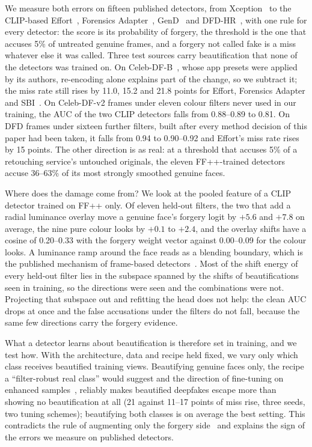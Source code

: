 \documentclass[conference]{IEEEtran}
\begin{document}
We measure both errors on fifteen published detectors, from Xception~\cite{xception} to the CLIP-based
Effort~\cite{effort}, Forensics Adapter~\cite{forensicsadapter}, GenD~\cite{gend2026} and DFD-HR~\cite{dfdhr2026}, with one rule for every detector: the score is its
probability of forgery, the threshold is the one that accuses 5\% of untreated genuine frames, and a forgery not called
fake is a miss whatever else it was called. Three test sources carry beautification that none of the detectors was
trained on. On Celeb-DF-B~\cite{libourel2024}, whose app presets were applied by its authors, re-encoding alone explains
part of the change, so we subtract it; the miss rate still rises by 11.0, 15.2 and 21.8 points for Effort, Forensics
Adapter and SBI~\cite{sbi}. On Celeb-DF-v2 frames under eleven colour filters never used in our training, the AUC of the
two CLIP detectors falls from 0.88--0.89 to 0.81. On DFD frames under sixteen further filters, built after every method
decision of this paper had been taken, it falls from 0.94 to 0.90--0.92 and Effort's miss rate rises by 15 points. The
other direction is as real: at a threshold that accuses 5\% of a retouching service's untouched originals, the eleven
FF++-trained detectors accuse 36--63\% of its most strongly smoothed genuine faces.

Where does the damage come from? We look at the pooled feature of a CLIP detector trained on FF++ only. Of eleven
held-out filters, the two that add a radial luminance overlay move a genuine face's forgery logit by $+5.6$ and $+7.8$
on average, the nine pure colour looks by $+0.1$ to $+2.4$, and the overlay shifts have a cosine of 0.20--0.33 with the
forgery weight vector against 0.00--0.09 for the colour looks. A luminance ramp around the face reads as a blending
boundary, which is the published mechanism of frame-based detectors~\cite{alphablend2026}. Most of the shift energy of
every held-out filter lies in the subspace spanned by the shifts of beautifications seen in training, so the directions
were seen and the combinations were not. Projecting that subspace out and refitting the head does not help: the clean AUC
drops at once and the false accusations under the filters do not fall, because the same few directions carry the forgery
evidence.

What a detector learns about beautification is therefore set in training, and we test how. With the architecture, data
and recipe held fixed, we vary only which class receives beautified training views. Beautifying genuine faces only, the
recipe a ``filter-robust real class'' would suggest and the direction of fine-tuning on enhanced samples~\cite{saeed2025},
reliably makes beautified deepfakes escape more than showing no beautification at all (21 against 11--17 points of miss
rise, three seeds, two tuning schemes); beautifying both classes is on average the best setting. This contradicts the
rule of augmenting only the forgery side~\cite{lsda} and explains the sign of the errors we measure on published
detectors.
\end{document}
